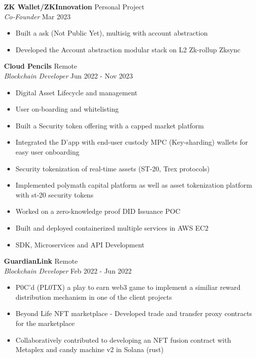 \documentclass[a4paper]{article}
\begin{document}
\textbf{ZK Wallet/ZKInnovation} \hfill Personal Project\\
\textit{Co-Founder} \hfill Mar 2023\\
\vspace{-1mm}
\begin{itemize} \itemsep 1pt
	\item Built a ask (Not Public Yet), multisig with account abstraction
    \item Developed the Account abstraction modular stack on L2 Zk-rollup Zksync
\end{itemize}
\textbf{Cloud Pencils} \hfill Remote\\
\textit{Blockchain Developer} \hfill Jun 2022 - Nov 2023\\
\vspace{-1mm}
\begin{itemize} \itemsep 1pt
    \item Digital Asset Lifecycle and management
    \item User on-boarding and whitelisting 
    \item Built a Security token offering with a capped market platform
    \item Integrated the D'app with end-user custody MPC (Key-sharding) wallets for easy user onboarding
    \item Security tokenization of real-time assets (ST-20, Trex protocols)
    \item Implemented polymath capital platform as well as asset tokenization platform with st-20 security tokens
    \item Worked on a zero-knowledge proof DID Issuance POC
	\item Built and deployed containerized multiple services in AWS EC2
	\item SDK, Microservices and API Development
\end{itemize}
\textbf{GuardianLink} \hfill Remote\\
\textit{Blockchain Developer} \hfill Feb 2022 - Jun 2022\\
\vspace{-1mm}
\begin{itemize} \itemsep 1pt
	\item P0C'd (PL0TX) a play to earn web3 game to implement a similiar reward distribution mechanism in one of the client projects
	\item Beyond Life NFT marketplace - Developed trade and transfer proxy contracts for the marketplace
    \item Collaboratively contributed to developing an NFT fusion contract with Metaplex and candy machine v2 in Solana (rust)
\end{itemize}
\end{document}

